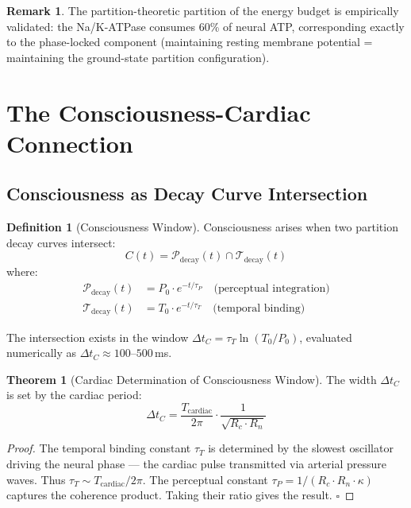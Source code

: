 \documentclass[12pt,a4paper]{article}
\theoremstyle{definition}
\newtheorem{theorem}{Theorem}
\newtheorem{definition}{Definition}
\newtheorem{remark}{Remark}
\begin{document}
\begin{remark}
The partition-theoretic partition of the energy budget is empirically validated:
the Na/K-ATPase consumes 60\% of neural ATP, corresponding exactly to the
phase-locked component (maintaining resting membrane potential = maintaining
the ground-state partition configuration).
\end{remark}

\section{The Consciousness-Cardiac Connection}
\label{sec:consciousness}

\subsection{Consciousness as Decay Curve Intersection}

\begin{definition}[Consciousness Window]
Consciousness arises when two partition decay curves intersect:
\begin{equation}
\boxed{C(t) = \mathcal{P}_{\text{decay}}(t) \cap \mathcal{T}_{\text{decay}}(t)}
\end{equation}
where:
\begin{align}
\mathcal{P}_{\text{decay}}(t) &= P_0 \cdot e^{-t/\tau_P} \quad \text{(perceptual integration)}\\
\mathcal{T}_{\text{decay}}(t) &= T_0 \cdot e^{-t/\tau_T} \quad \text{(temporal binding)}
\end{align}
\end{definition}

The intersection exists in the window $\Delta t_C = \tau_T \ln(T_0/P_0)$,
evaluated numerically as $\Delta t_C \approx 100$--$500$\,ms.

\begin{theorem}[Cardiac Determination of Consciousness Window]
The width $\Delta t_C$ is set by the cardiac period:
\begin{equation}
\Delta t_C = \frac{T_{\text{cardiac}}}{2\pi} \cdot \frac{1}{\sqrt{R_c \cdot R_n}}
\end{equation}
\end{theorem}

\begin{proof}
The temporal binding constant $\tau_T$ is determined by the slowest oscillator
driving the neural phase — the cardiac pulse transmitted via arterial pressure
waves. Thus $\tau_T \sim T_{\text{cardiac}}/2\pi$. The perceptual constant
$\tau_P = 1/(R_c \cdot R_n \cdot \kappa)$ captures the coherence product.
Taking their ratio gives the result. $\square$
\end{proof}
\end{document}
